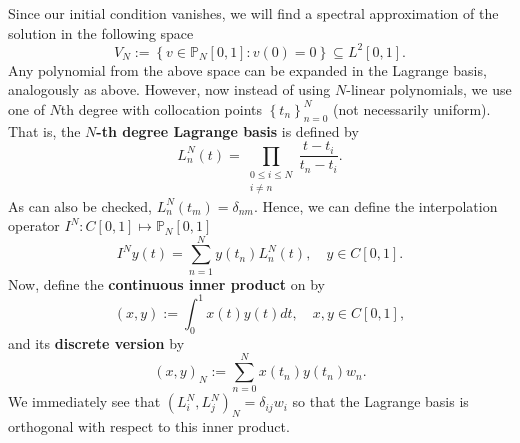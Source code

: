 \documentclass[12pt,a4paper]{article}
\begin{document}
Since our initial condition vanishes, we will find a spectral approximation of the solution in the following space
\begin{equation}
	V_N := \left\{v \in \mathbb{P}_N[0,1]: v(0) = 0 \right\} \subseteq L^2[0,1].
\end{equation}
Any polynomial from the above space can be expanded in the Lagrange basis, analogously as above. However, now instead of using $N$-linear polynomials, we use one of $N$th degree with collocation points $\left\{t_n\right\}_{n=0}^N$ (not necessarily uniform). That is, the \textbf{$N$-th degree Lagrange basis} is defined by 
\begin{equation}
	L^N_n(t) = \prod_{\substack{0\leq i \leq N \\i \neq n}} \frac{t - t_i}{t_n - t_i}.
\end{equation} 
As can also be checked, $L^N_n(t_m) = \delta_{nm}$. Hence, we can define the interpolation operator $I^N: C[0,1] \mapsto \mathbb{P}_N[0,1]$
\begin{equation}
	I^N y(t) = \sum_{n=1}^N y(t_n) L^N_n(t), \quad y \in C[0,1].
\end{equation}
Now, define the \textbf{continuous inner product} on by
\begin{equation}
	(x,y) := \int_0^1 x(t) y(t) dt, \quad x, y \in C[0,1],
\end{equation}
and its \textbf{discrete version} by
\begin{equation}\label{eqn:DiscreteInnerProduct}
	(x,y)_N := \sum_{n=0}^N x(t_n) y(t_n) w_n.
\end{equation}
We immediately see that $(L^N_i, L^N_j)_N = \delta_{i j} w_i$ so that the Lagrange basis is orthogonal with respect to this inner product.  
\end{document}
